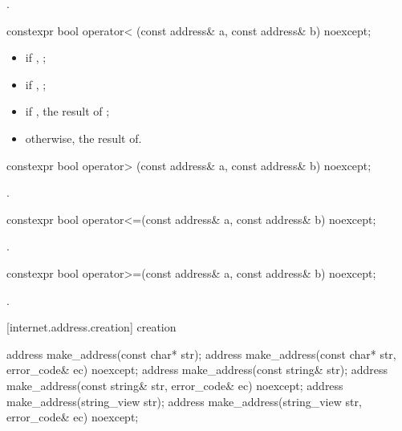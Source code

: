\begin{itemdescr}
\pnum
\returns {}.
\end{itemdescr}

\begin{itemdecl}
constexpr bool operator< (const address& a, const address& b) noexcept;
\end{itemdecl}

\begin{itemdescr}
\pnum
\returns 
\begin{itemize}
\item
 if , ;
\item
 if , ;
\item
 if , the result of ;
\item
 otherwise, the result of.
\end{itemize}
\end{itemdescr}

\begin{itemdecl}
constexpr bool operator> (const address& a, const address& b) noexcept;
\end{itemdecl}

\begin{itemdescr}
\pnum
\returns {}.
\end{itemdescr}

\begin{itemdecl}
constexpr bool operator<=(const address& a, const address& b) noexcept;
\end{itemdecl}

\begin{itemdescr}
\pnum
\returns {}.
\end{itemdescr}

\begin{itemdecl}
constexpr bool operator>=(const address& a, const address& b) noexcept;
\end{itemdecl}

\begin{itemdescr}
\pnum
\returns {}.
\end{itemdescr}



[internet.address.creation]{ creation}

\begin{itemdecl}
address make_address(const char* str);
address make_address(const char* str, error_code& ec) noexcept;
address make_address(const string& str);
address make_address(const string& str, error_code& ec) noexcept;
address make_address(string_view str);
address make_address(string_view str, error_code& ec) noexcept;
\end{itemdecl}

